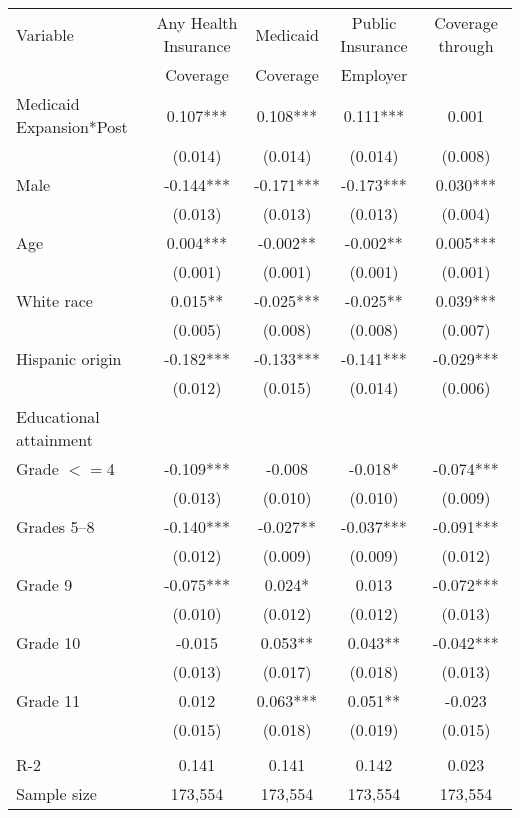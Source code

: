 \begin{tabular}{lcccc}
\toprule
\toprule
 Variable & Any Health Insurance & Medicaid & Public Insurance & Coverage through \\
  & Coverage & Coverage &  Employer \\
\midrule 
 Medicaid Expansion*Post   & 0.107***   & 0.108***   & 0.111***   & 0.001  \\
 & (0.014)   & (0.014)   & (0.014)   & (0.008)  \\
 Male   & -0.144***   & -0.171***   & -0.173***   & 0.030***  \\
 & (0.013)   & (0.013)   & (0.013)   & (0.004)  \\
 Age   & 0.004***   & -0.002**   & -0.002**   & 0.005***  \\
 & (0.001)   & (0.001)   & (0.001)   & (0.001)  \\
 White race   & 0.015**   & -0.025***   & -0.025**   & 0.039***  \\
 & (0.005)   & (0.008)   & (0.008)   & (0.007)  \\
 Hispanic origin   & -0.182***   & -0.133***   & -0.141***   & -0.029***  \\
 & (0.012)   & (0.015)   & (0.014)   & (0.006)  \\
 Educational attainment  \\
 \hspace{0.3cm} Grade $<=$4   & -0.109***   & -0.008   & -0.018*   & -0.074***  \\
 & (0.013)   & (0.010)   & (0.010)   & (0.009)  \\
 \hspace{0.3cm}  Grades 5--8   & -0.140***   & -0.027**   & -0.037***   & -0.091***  \\
 & (0.012)   & (0.009)   & (0.009)   & (0.012)  \\
 \hspace{0.3cm} Grade 9   & -0.075***   & 0.024*   & 0.013   & -0.072***  \\
 & (0.010)   & (0.012)   & (0.012)   & (0.013)  \\
 \hspace{0.3cm} Grade 10   & -0.015   & 0.053**   & 0.043**   & -0.042***  \\
 & (0.013)   & (0.017)   & (0.018)   & (0.013)  \\
 \hspace{0.3cm} Grade 11   & 0.012   & 0.063***   & 0.051**   & -0.023  \\
 & (0.015)   & (0.018)   & (0.019)   & (0.015)  \\
\\
R-2 & 0.141 & 0.141 & 0.142 & 0.023 \\
Sample size & 173,554 & 173,554 & 173,554 & 173,554 \\
\bottomrule
\bottomrule
\end{tabular}